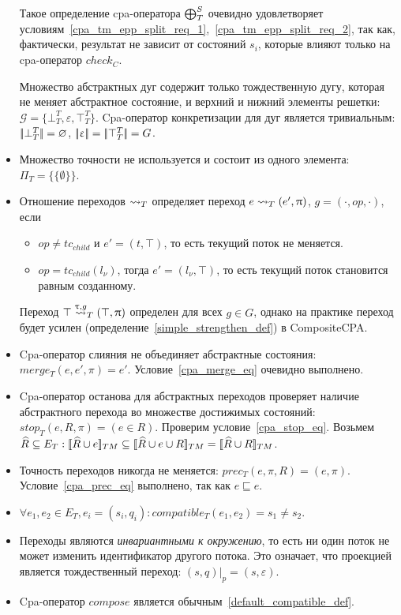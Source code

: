 \begin{itemize}
Такое определение cpa-оператора $\mathrel{\bigoplus}^S_T$ очевидно удовлетворяет условиям~\ref{cpa_tm_epp_split_req_1},~\ref{cpa_tm_epp_split_req_2}, так как, фактически, результат не зависит от состояний $s_i$, которые влияют только на cpa-оператор $check_C$.

Множество абстрактных дуг содержит только тождественную дугу, которая не меняет абстрактное состояние, и верхний и нижний элементы решетки: $\mathcal{G} = \{\bot^T_T, \varepsilon, \top^T_T\}$.
Cpa-оператор конкретизации для дуг является тривиальным: $\lvert \! \lvert \bot^T_T \rvert \! \rvert = \varnothing$, $\lvert \! \lvert \upvarepsilon \rvert \! \rvert = \lvert \! \lvert \top^T_T \rvert \! \rvert = G$.

\item Множество точности не используется и состоит из одного элемента: $\Pi_T = \{\{\emptyset\}\}$.

\item Отношение переходов $\leadsto_T$ определяет переход $e \leadsto_T (e', \uppi)$, $g=(\cdot,op,\cdot)$, если 
\begin{itemize}
\item $op\neq tc_{child}$ и $e' = (t, \top)$, то есть текущий поток не меняется.
\item $op=tc_{child}(l_\nu)$, тогда $e' = (l_\nu, \top)$, то есть текущий поток становится равным созданному.
\end{itemize}

Переход $\top \stackrel{\uptau, g}{\leadsto}_T (\top, \uppi)$ определен для всех $g\in G$, однако на практике переход будет усилен (определение~\ref{simple_strengthen_def}) в CompositeCPA.

\item Cpa-оператор слияния не объединяет абстрактные состояния: $merge_T(e, e', \pi) = e'$. Условие~\ref{cpa_merge_eq} очевидно выполнено.

\item Cpa-оператор останова для абстрактных переходов проверяет наличие абстрактного перехода во множестве достижимых состояний: $stop_T(e, R, \pi) = (e \in R)$.
Проверим условие~\ref{cpa_stop_eq}.
Возьмем $\widehat{R} \subseteq E_T: [\![ \widehat{R} \cup e ]\!]_{TM} \subseteq [\![ \widehat{R} \cup e \cup R ]\!]_{TM} = [\![ \widehat{R} \cup R ]\!]_{TM}$.

\item Точность переходов никогда не меняется: $prec_T(e, \pi, R) = (e, \pi)$. Условие~\ref{cpa_prec_eq} выполнено, так как $e \sqsubseteq e$.

\item $\forall e_1, e_2 \in E_T, e_i = (s_i, q_i):compatible_T(e_1,e_2) = s_1 \neq s_2$.

\item Переходы являются {\em инвариантными к окружению}, то есть ни один поток не может изменить идентификатор другого потока.
Это означает, что проекцией является тождественный переход:
$(s, q)|_p = (s, \varepsilon)$.

\item Cpa-оператор $compose$ является обычным~\ref{default_compatible_def}.
\end{itemize}


